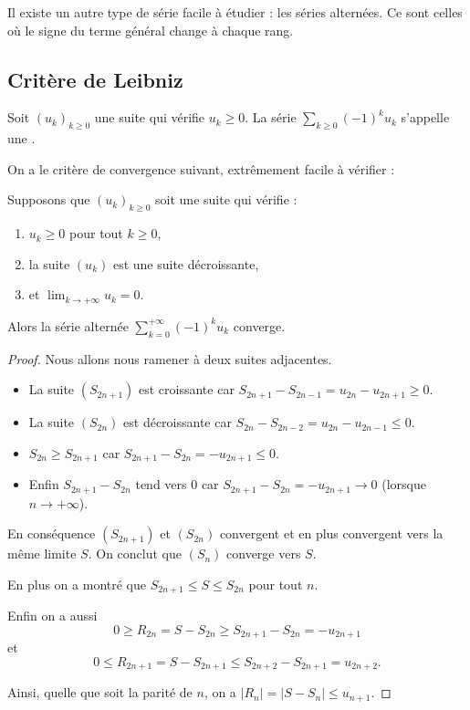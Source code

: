\documentclass[class=report,crop=false]{standalone}
\begin{document}
Il existe un autre type de série facile à étudier : les séries alternées.
Ce sont celles où le signe du terme général change à chaque rang.

\subsection{Critère de Leibniz}


Soit $(u_k)_{k\ge0}$ une suite qui vérifie $u_k \ge 0$. La série $\sum_{k \ge 0} (-1)^k u_k$ 
s'appelle une .


On a le critère de convergence suivant, extrêmement facile à vérifier :
\begin{theoreme}
\label{th:seriealternee}
Supposons que $(u_k)_{k\ge0}$ soit une suite qui vérifie :
\begin{enumerate}
  \item $u_k  \ge 0$ pour tout $k \ge 0$,
  \item la suite $(u_k)$ est une suite décroissante,
  \item et $\lim_{k\to+\infty} u_k=0$.
\end{enumerate}
Alors la série alternée $\displaystyle \sum_{k=0}^{+\infty} (-1)^k u_k$ converge.
\end{theoreme}

\begin{proof}
Nous allons nous ramener à deux suites adjacentes.

\begin{itemize}
  \item La suite $(S_{2n+1})$ est croissante car 
  $S_{2n+1}-S_{2n-1}=u_{2n}-u_{2n+1}\ge 0$.
  
  \item La suite $(S_{2n})$ est décroissante car
  $S_{2n}-S_{2n-2}= u_{2n}-u_{2n-1}\le 0$.
  
  \item $S_{2n} \ge S_{2n+1}$ car 
  $S_{2n+1} - S_{2n} = -u_{2n+1} \le 0$.
  
  \item Enfin $S_{2n+1} - S_{2n}$ tend vers $0$
  car $S_{2n+1} - S_{2n} = -u_{2n+1} \to 0$
  (lorsque $n\to+\infty$).
\end{itemize}
En conséquence $(S_{2n+1})$ et $(S_{2n})$ convergent
et en plus convergent vers la même limite $S$.
On conclut que $(S_n)$ converge vers $S$.

En plus on a montré que $S_{2n+1} \le S \le S_{2n}$ pour tout $n$.

Enfin on a aussi 
 $$0\ge R_{2n}= S-S_{2n} \ge S_{2n+1}-S_{2n}=-u_{2n+1}$$ et
 $$0\le R_{2n+1}= S-S_{2n+1} \le  S_{2n+2} -S_{2n+1}= u_{2n+2}.$$
 
 Ainsi, quelle que soit la parité de $n$, on a 
 $|R_n|=|S-S_n|\le  u_{n+1}$.
 \end{proof}
 
\end{document}
